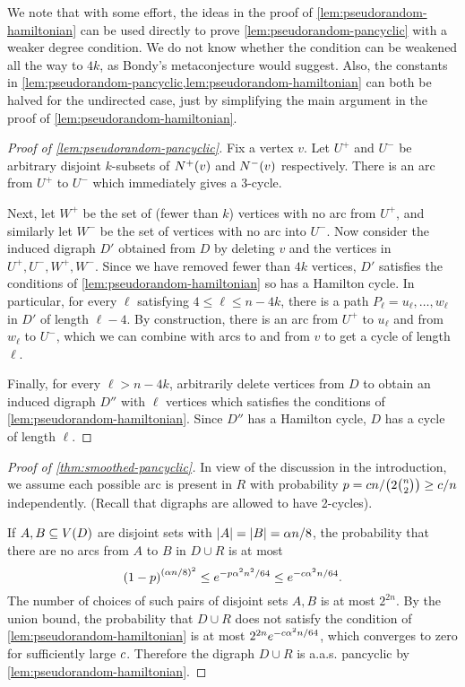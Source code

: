 \documentclass[11pt,english]{article}
\theoremstyle{plain}
\theoremstyle{definition}
\theoremstyle{definition}
\theoremstyle{plain}
\theoremstyle{plain}
\theoremstyle{plain}
\theoremstyle{plain}
\theoremstyle{remark}
\theoremstyle{remark}
\let\originalleft\left
\let\originalright\right
\renewcommand{\left}{\mathopen{}\mathclose\bgroup\originalleft}
\renewcommand{\right}{\aftergroup\egroup\originalright}
\begin{document}
We note that with some effort, the ideas in the proof of
\ref{lem:pseudorandom-hamiltonian} can be used directly to prove
 \ref{lem:pseudorandom-pancyclic} with a weaker degree condition.
We do not know whether the condition can be weakened all the way to
$4k$, as Bondy's metaconjecture would suggest. Also, the constants in \ref{lem:pseudorandom-pancyclic,lem:pseudorandom-hamiltonian}
can both be halved for the undirected case, just by simplifying the
main argument in the proof of \ref{lem:pseudorandom-hamiltonian}.

\begin{proof}
[Proof of \ref{lem:pseudorandom-pancyclic}]Fix a vertex $v$. Let
$U^{+}$ and $U^{-}$ be arbitrary disjoint $k$-subsets of $N^{+}\left(v\right)$
and $N^{-}\left(v\right)$ respectively. There is an arc from $U^{+}$
to $U^{-}$ which immediately gives a 3-cycle.

Next, let $W^{+}$ be the set of (fewer than $k$) vertices with no
arc from $U^{+}$, and similarly let $W^{-}$ be the set of vertices
with no arc into $U^{-}$. Now consider the induced digraph $D'$
obtained from $D$ by deleting $v$ and the vertices in $U^{+},U^{-},W^{+},W^{-}$.
Since we have removed fewer than $4k$ vertices, $D'$ satisfies the
conditions of \ref{lem:pseudorandom-hamiltonian} so has a Hamilton
cycle. In particular, for every $\ell$ satisfying $4\le\ell\le n-4k$,
there is a path $P_{\ell}=u_{\ell},\dots, w_{\ell}$ in $D'$ of length
$\ell-4$. By construction, there is an arc from $U^{+}$ to $u_{\ell}$
and from $w_{\ell}$ to $U^{-}$, which we can combine with arcs to
and from $v$ to get a cycle of length $\ell$.

Finally, for every $\ell>n-4k$, arbitrarily delete vertices from
$D$ to obtain an induced digraph $D''$ with $\ell$ vertices which
satisfies the conditions of \ref{lem:pseudorandom-hamiltonian}. Since
$D''$ has a Hamilton cycle, $D$ has a cycle of length $\ell$.
\end{proof}

\begin{proof}
[Proof of \ref{thm:smoothed-pancyclic}]In view of the discussion
in the introduction, we assume each possible arc is present in $R$
with probability $p=\cdi n/\left(2{n \choose 2}\right)\ge\cdi/n$ independently. (Recall that digraphs are allowed to have 2-cycles).

If $A,B\subseteq V\left(D\right)$ are disjoint sets with $\left|A\right|=\left|B\right|=\alpha n/8$,
the probability that there are no arcs from $A$ to $B$ in $D\cup R$
is at most
\[
\left(1-p\right)^{\left(\alpha n/8\right)^{2}}\le e^{-p\alpha^{2}n^{2}/64}\le e^{-\cdi\alpha^{2}n/64}.
\]
The number of choices of such pairs of disjoint sets $A,B$ is at most $2^{2n}$. By the union bound,
the probability that $D\cup R$ does not satisfy the condition of
\ref{lem:pseudorandom-hamiltonian} is at most $2^{2n}e^{-c\alpha^{2}n/64}$, which 
converges to zero for sufficiently large $c$. Therefore the digraph $D\cup R$ is a.a.s.{} 
pancyclic by \ref{lem:pseudorandom-hamiltonian}.\end{proof}
\end{document}
